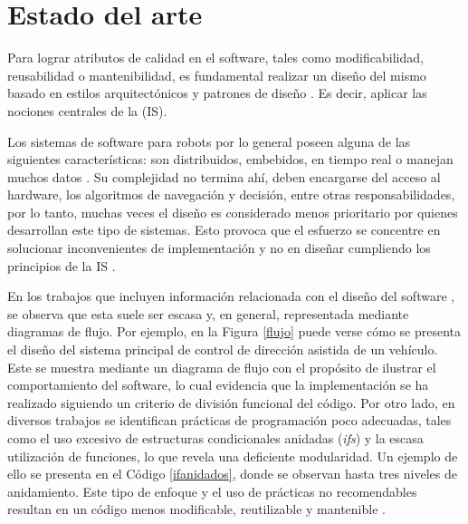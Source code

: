 %
%


\chapter{Estado del arte}
\label{estadoDelArte}


Para lograr atributos de calidad en el software, tales como modificabilidad, reusabilidad o mantenibilidad, es fundamental realizar un diseño del mismo basado en estilos arquitectónicos y patrones de diseño \cite{Gamma:1995:DPE:186897,ShawGarlan1996,buschmann,ghezzi2003,DBLP:books/daglib/0030743,bass2003}. Es decir, aplicar las nociones centrales de la  (\gls{IS}).

Los sistemas de software para robots por lo general poseen alguna de las siguientes características: son distribuidos, embebidos, en tiempo real o manejan muchos datos \cite{noergaard2005embedded, braunl2003embedded}. Su complejidad no termina ahí, deben encargarse del acceso al hardware, los algoritmos de navegación y decisión, entre otras responsabilidades, por lo tanto, muchas veces el diseño es considerado menos prioritario por quienes desarrollan este tipo de sistemas. Esto provoca que el esfuerzo se concentre en solucionar inconvenientes de implementación y no en diseñar cumpliendo los principios de la \gls{IS} \cite{Brugali2009}.

En los trabajos que incluyen información relacionada con el diseño del software \cite{bad-desing-auto,bad-desing-implantable,code-1,code-2,Zhang2009,bad-design-uml,bad-design-robot}, se observa que esta suele ser escasa y, en general, representada mediante diagramas de flujo. Por ejemplo, en la Figura \ref{flujo} puede verse cómo se presenta el diseño del sistema principal de control de dirección asistida de un vehículo. Este se muestra mediante un diagrama de flujo con el propósito de ilustrar el comportamiento del software, lo cual evidencia que la implementación se ha realizado siguiendo un criterio de división funcional del código. Por otro lado, en diversos trabajos se identifican prácticas de programación poco adecuadas, tales como el uso excesivo de estructuras condicionales anidadas (\textit{ifs}) y la escasa utilización de funciones, lo que revela una deficiente modularidad. Un ejemplo de ello se presenta en el Código \ref{ifanidados}, donde se observan hasta tres niveles de anidamiento. Este tipo de enfoque y el uso de prácticas no recomendables resultan en un código menos modificable, reutilizable y mantenible \cite{Parnas1972}.

